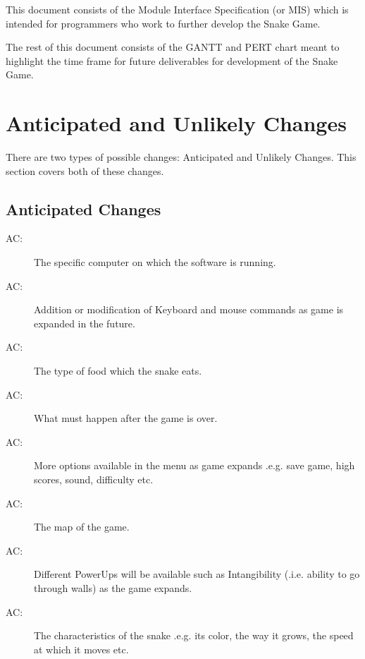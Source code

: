 \documentclass[12pt]{article}
\newcounter{acnum}
\newcommand{\actheacnum}{AC\theacnum}
\begin{document}
This document consists of the Module Interface Specification (or MIS) which is intended for programmers who work to further develop the Snake Game.

The rest of this document consists of the GANTT and PERT chart meant to highlight the time frame for future deliverables for development of the Snake Game.

\section{Anticipated and Unlikely Changes} \label{SecChange}

There are two types of possible changes: Anticipated and Unlikely Changes. This section covers both of these changes.

\subsection{Anticipated Changes} \label{SecAchange}



\begin{description}
\item[ \actheacnum \label{acHardware}:] The specific computer on which the software is running.
\item[ \actheacnum \label{acInput}:] Addition or modification of Keyboard and mouse commands as game is expanded in the future.
\item[ \actheacnum \label{acFood}:] The type of food which the snake eats.
\item[ \actheacnum \label{acGameOver}:] What must happen after the game is over.
\item[ \actheacnum \label{acMainMenu}:] More options available in the menu as game expands .e.g. save game, high scores, sound, difficulty etc.
\item[ \actheacnum \label{acPlayMap}:] The map of the game.
\item[ \actheacnum \label{acPowerUps}:] Different PowerUps will be available such as Intangibility (.i.e. ability to go through walls) as the game expands.
\item[ \actheacnum \label{acSnake}:] The characteristics of the snake .e.g. its color, the way it grows, the speed at which it moves etc.
\end{description}
\end{document}
